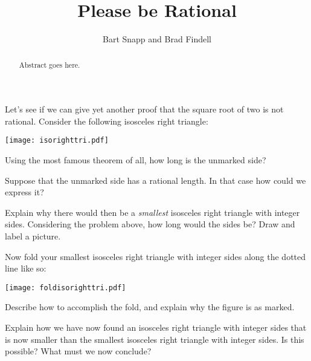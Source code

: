 \documentclass{ximera}
\title{Please be Rational}
\author{Bart Snapp and Brad Findell}
\begin{document}
\begin{abstract}
Abstract goes here.  
\end{abstract}
\maketitle

Let's see if we can give yet another proof that the square root of two
is not rational. Consider the following isosceles right triangle:
\begin{image}
\texttt{[image: isorighttri.pdf]}
\end{image}
\begin{problem}
Using the most famous theorem of all, how long is the unmarked side?
\end{problem}

\begin{problem} 
Suppose that the unmarked side has a rational length. In that case how
could we express it?
\end{problem}

\begin{problem}
Explain why there would then be a \textit{smallest} isosceles right
triangle with integer sides. Considering the problem above, how long
would the sides be? Draw and label a picture.
\end{problem}

\newpage
\begin{problem}
Now fold your smallest isosceles right triangle with integer sides
along the dotted line like so:
\begin{image}
\texttt{[image: foldisorighttri.pdf]}
\end{image}
Describe how to accomplish the fold, and explain why the figure is as marked.  
\end{problem}
\vspace{1in}

\begin{problem}
Explain how we have now found an isosceles right triangle with integer
sides that is now smaller than the smallest isosceles right triangle
with integer sides. Is this possible? What must we now conclude?
\end{problem}
\end{document}
